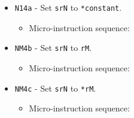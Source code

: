 \documentclass{article}
\def\specialtoaddr#1{\Verb|#1102| - output \Verb|sr#1| to addr bus}
\def\pkptrout{\Verb|0202| - output *\Verb|pk| to data bus}
\def\datatooffs{\Verb|4402| - write to \Verb|offs| from data bus}
\def\incrementpk{\Verb|0502| - increment \Verb|pk|}
\def\writeRAMo{\Verb|0104| - write data bus to *(addr bus+\Verb|offs|)}
\def\echodatalong{\Verb|0025| - echo data bus to itself for 3 cycles}
\def\done{\Verb|fffe| - end instruction}
\begin{document}
\begin{itemize}
    \item \Verb|N14a| - Set \Verb|srN| to \Verb|*constant|.
    \begin{itemize}
        \item Micro-instruction sequence:
    \end{itemize}
    
    \item \Verb|NM4b| - Set \Verb|srN| to \Verb|rM|.
    \begin{itemize}
        \item Micro-instruction sequence:
    \end{itemize}
    
    \item \Verb|NM4c| - Set \Verb|srN| to \Verb|*rM|.
    \begin{itemize}
        \item Micro-instruction sequence:
    \end{itemize}
    

\end{itemize}
\end{document}
